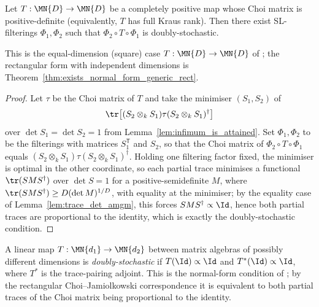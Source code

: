 \begin{theorem}\label{thm:exists_normal_form_generic}
    \leanok
    Let $T : \MN{D} \to \MN{D}$ be a completely positive map whose Choi matrix
    is positive-definite (equivalently, $T$ has full Kraus rank). Then there
    exist SL-filterings $\Phi_{1},\Phi_{2}$ such that
    $\Phi_{2}\circ T\circ\Phi_{1}$ is doubly-stochastic.

    This is the equal-dimension (square) case $T : \MN{D} \to \MN{D}$ of
    \cite[Proposition~2.9]{Wolf2012Quantum}; the rectangular form with
    independent dimensions is
    Theorem~\ref{thm:exists_normal_form_generic_rect}.
\end{theorem}

\begin{proof}\leanok
    Let $\tau$ be the Choi matrix of $T$ and take the minimiser
    $(S_{1},S_{2})$ of
    \begin{align}
        \tr\!\left[(S_{2}\otimes_{k}S_{1})\tau
            (S_{2}\otimes_{k}S_{1})^{\dagger}\right]
        \notag
    \end{align}
    over $\det S_{1}=\det S_{2}=1$ from
    Lemma~\ref{lem:infimum_is_attained}. Set $\Phi_{1},\Phi_{2}$ to be the
    filterings with matrices $S_{1}^{\mathsf T}$ and $S_{2}$, so that the Choi
    matrix of $\Phi_{2}\circ T\circ\Phi_{1}$ equals
    $(S_{2}\otimes_{k}S_{1})\tau
    (S_{2}\otimes_{k}S_{1})^{\dagger}$. Holding one filtering factor fixed,
    the minimiser is optimal in the other coordinate, so each partial trace
    minimises a functional $\tr(SMS^{\dagger})$ over $\det S=1$ for a
    positive-semidefinite $M$, where
    $\tr(SMS^{\dagger})\geq D(\det M)^{1/D}$, with equality at the minimiser;
    by the equality case of Lemma~\ref{lem:trace_det_amgm}, this forces
    $SMS^{\dagger}\propto\Id$, hence both partial traces are proportional to
    the identity, which is exactly the doubly-stochastic condition.
\end{proof}

\begin{definition}
    \label{def:doubly_stochastic_rect}
    \leanok
    A linear map $T : \MN{d_1} \to \MN{d_2}$ between matrix algebras of
    possibly different dimensions is \emph{doubly-stochastic} if
    $T(\Id)\propto\Id$ and $T^{*}(\Id)\propto\Id$, where $T^{*}$ is the
    trace-pairing adjoint.  This is the normal-form condition of
    \cite[Proposition~2.9]{Wolf2012Quantum}; by the rectangular
    Choi--Jamiolkowski correspondence it is equivalent to both partial traces
    of the Choi matrix being proportional to the identity.
\end{definition}

